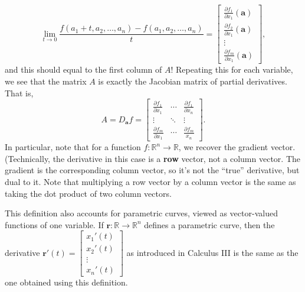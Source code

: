 \documentclass[12pt,letterpaper]{article}
\newcommand{\R}{\mathbb{R}}
\newcommand{\x}{\mathbf{x}}
\newcommand{\aaa}{\mathbf{a}}
\begin{document}
\[
 \lim_{t\to 0}\frac{f(a_1+t,a_2,\ldots, a_n)-f(a_1,a_2,\ldots, a_n)}{t} = \begin{bmatrix}\frac{\partial f_1}{\partial x_1}(\aaa)\\\frac{\partial f_2}{\partial x_1}(\aaa)\\\vdots\\\frac{\partial f_m}{\partial x_1}(\aaa)\end{bmatrix},
\]
and this should equal to the first column of $A$! Repeating this for each variable, we see that the matrix $A$ is exactly the Jacobian matrix of partial derivatives. That is,
\[
 A = D_{\aaa}f = \begin{bmatrix}\frac{\partial f_1}{\partial x_1} & \cdots & \frac{\partial f_1}{\partial x_n}\\
                  \vdots & \ddots & \vdots \\
		  \frac{\partial f_m}{\partial x_1} & \cdots & \frac{\partial f_m}{x_n}
                 \end{bmatrix}.
\]
In particular, note that for a function $f:\R^n\to \R$, we recover the gradient vector. (Technically, the derivative in this case is a {\bf row} vector, not a column vector. The gradient is the corresponding column vector, so it's not the ``true'' derivative, but dual to it. Note that multiplying a row vector by a column vector is the same as taking the dot product of two column vectors. 

This definition also accounts for parametric curves, viewed as vector-valued functions of one variable. If $\mathbf{r}:\R\to \R^n$ defines a parametric curve, then the derivative $\mathbf{r}'(t) = \begin{bmatrix}x_1'(t)\\x_2'(t)\\\vdots \\x_n'(t)\end{bmatrix}$ as introduced in Calculus III is the same as the one obtained using this definition.
\end{document}
